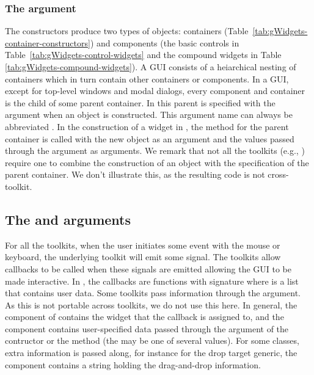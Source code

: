 \subsubsection{The  argument}

The constructors produce two types of objects: containers
(Table~\ref{tab:gWidgets-container-constructors}) and components (the
basic controls in Table~\ref{tab:gWidgets-control-widgets} and the
compound widgets in Table \ref{tab:gWidgets-compound-widgets}).  A GUI
consists of a heiarchical nesting of containers which in turn contain
other containers or components. In a GUI, except for top-level windows
and modal dialogs, every component and container is the child of some
parent container. In  this parent is specified with the
 argument when an object is constructed. This argument
name can always be abbreviated . In the construction of a
widget in , the  method for the parent
container is called with the new object as an argument and the values
passed through the   argument as arguments.  We remark that
not all the toolkits (e.g., ) require one to combine the
construction of an object with the specification of the parent
container. We don't illustrate this, as the resulting code is not cross-toolkit.


\subsection{The  and  arguments}
\label{sec:callbacks}


For all the toolkits, when the user initiates some event with the
mouse or keyboard, the underlying toolkit will emit some signal. The
toolkits allow callbacks to be called when these signals are emitted
allowing the GUI to be made interactive. In , the
callbacks are functions with signature  where 
is a list that contains user data. Some toolkits pass information
through the  argument. As this is not portable across
toolkits, we do not use this here. In general, the 
component of  contains the widget that the callback is
assigned to, and the component  contains user-specified
data passed through the  argument of the contructor or
the  method (the  may be one of several
values). For some classes, extra information is passed along, for
instance for the drop target generic, the component 
contains a string holding the drag-and-drop information.


